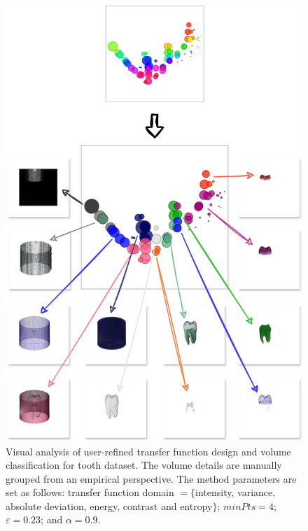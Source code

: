 \begin{figure}[htb!]
    \centering
    \includegraphics[width=\columnwidth]{figs/tooth-groups.jpg}
    \caption{Visual analysis of user-refined transfer function design and volume classification for tooth dataset. The volume details are manually grouped from an empirical perspective. The method parameters are set as follows: transfer function domain $ =\{$intensity, variance, absolute deviation, energy, contrast and entropy$\}$; $minPts = 4$; $\varepsilon = 0.23$; and $\alpha = 0.9$.}
    \label{fig:tooth-groups}
\end{figure}